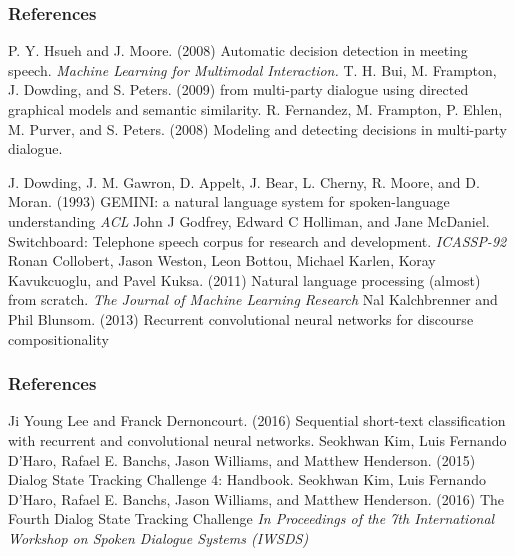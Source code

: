 \documentclass{beamer}
\begin{document}
\begin{frame}
\frametitle{References}
\footnotesize{
\begin{thebibliography}{99} %
 P. Y. Hsueh and J. Moore. (2008)
\newblock Automatic decision detection in meeting speech.
\newblock \emph{Machine Learning for Multimodal Interaction.}
T. H. Bui, M. Frampton, J. Dowding, and S. Peters.   (2009)
\newblock from multi-party dialogue using directed graphical models and semantic similarity.
\newblock \emph{}
 R. Fernandez, M. Frampton, P. Ehlen, M. Purver, and S. Peters. (2008)
\newblock Modeling and detecting decisions in multi-party dialogue.
\newblock \emph{}

J. Dowding, J. M. Gawron, D. Appelt, J. Bear, L. Cherny,
R. Moore, and D. Moran. (1993)
\newblock GEMINI: a natural language system for spoken-language understanding
\newblock \emph{ACL}
John J Godfrey, Edward C Holliman, and Jane McDaniel.
\newblock Switchboard: Telephone speech corpus for research and development.
\newblock \emph{ICASSP-92}
Ronan Collobert, Jason Weston, Leon Bottou, Michael Karlen, Koray Kavukcuoglu, and Pavel Kuksa. (2011)
\newblock Natural language processing (almost) from scratch. 
\newblock \emph{The Journal of Machine Learning Research}
Nal Kalchbrenner and Phil Blunsom. (2013)
\newblock Recurrent convolutional neural networks for discourse compositionality
\newblock \emph{}

\end{thebibliography}
}
\end{frame}

\begin{frame}
\frametitle{References}
\footnotesize{
\begin{thebibliography}{99} 

Ji Young Lee and Franck Dernoncourt. (2016)
\newblock Sequential short-text classification with recurrent and convolutional neural networks.
\newblock \emph{}
 Seokhwan Kim, Luis Fernando D'Haro,
Rafael E. Banchs, Jason Williams, and Matthew Henderson. (2015)
\newblock Dialog  State  Tracking  Challenge  4: Handbook.
\newblock \emph{}
 Seokhwan Kim, Luis Fernando D'Haro,
Rafael E. Banchs, Jason Williams, and Matthew Henderson. (2016)
\newblock The Fourth Dialog State Tracking Challenge
\newblock \emph{In Proceedings of the 7th International Workshop on Spoken Dialogue Systems (IWSDS)}

\end{thebibliography}
}
\end{frame}

\end{document}
